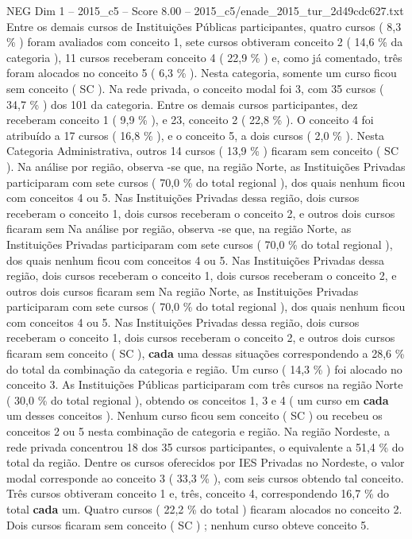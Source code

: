 \begin{textsample}{NEG Dim 1 – 2015\_c5 – Score 8.00 – 2015\_c5/enade\_2015\_tur\_2d49cdc627.txt}
Entre os demais cursos de Instituições Públicas participantes, quatro cursos ( 8,3 \% ) foram avaliados com conceito 1, sete cursos obtiveram conceito 2 ( 14,6 \% da categoria ), 11 cursos receberam conceito 4 ( 22,9 \% ) e, como já comentado, três foram alocados no conceito 5 ( 6,3 \% ).
Nesta categoria, somente um curso ficou sem conceito ( SC ).
Na rede privada, o conceito modal foi 3, com 35 cursos ( 34,7 \% ) dos 101 da categoria.
Entre os demais cursos participantes, dez receberam conceito 1 ( 9,9 \% ), e 23, conceito 2 ( 22,8 \% ).
O conceito 4 foi atribuído a 17 cursos ( 16,8 \% ), e o conceito 5, a dois cursos ( 2,0 \% ).
Nesta Categoria Administrativa, outros 14 cursos ( 13,9 \% ) ficaram sem conceito ( SC ).
Na análise por região, observa -se que, na região Norte, as Instituições Privadas participaram com sete cursos ( 70,0 \% do total regional ), dos quais nenhum ficou com conceitos 4 ou 5.
Nas Instituições Privadas dessa região, dois cursos receberam o conceito 1, dois cursos receberam o conceito 2, e outros dois cursos ficaram sem Na análise por região, observa -se que, na região Norte, as Instituições Privadas participaram com sete cursos ( 70,0 \% do total regional ), dos quais nenhum ficou com conceitos 4 ou 5.
Nas Instituições Privadas dessa região, dois cursos receberam o conceito 1, dois cursos receberam o conceito 2, e outros dois cursos ficaram sem Na região Norte, as Instituições Privadas participaram com sete cursos ( 70,0 \% do total regional ), dos quais nenhum ficou com conceitos 4 ou 5.
Nas Instituições Privadas dessa região, dois cursos receberam o conceito 1, dois cursos receberam o conceito 2, e outros dois cursos ficaram sem conceito ( SC ), \textbf{cada} uma dessas situações correspondendo a 28,6 \% do total da combinação da categoria e região.
Um curso ( 14,3 \% ) foi alocado no conceito 3.
As Instituições Públicas participaram com três cursos na região Norte ( 30,0 \% do total regional ), obtendo os conceitos 1, 3 e 4 ( um curso em \textbf{cada} um desses conceitos ).
Nenhum curso ficou sem conceito ( SC ) ou recebeu os conceitos 2 ou 5 nesta combinação de categoria e região.
Na região Nordeste, a rede privada concentrou 18 dos 35 cursos participantes, o equivalente a 51,4 \% do total da região.
Dentre os cursos oferecidos por IES Privadas no Nordeste, o valor modal corresponde ao conceito 3 ( 33,3 \% ), com seis cursos obtendo tal conceito.
Três cursos obtiveram conceito 1 e, três, conceito 4, correspondendo 16,7 \% do total \textbf{cada} um.
Quatro cursos ( 22,2 \% do total ) ficaram alocados no conceito 2.
Dois cursos ficaram sem conceito ( SC ) ; nenhum curso obteve conceito 5.

\end{textsample}
